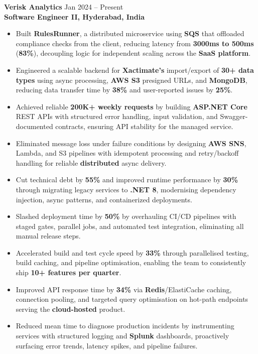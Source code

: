 \documentclass[a4paper,10pt]{article}
\begin{document}
\textbf{Verisk Analytics} \hfill Jan 2024 -- Present \\
\textbf{Software Engineer II, Hyderabad, India}
\begin{itemize}[leftmargin=*]
    \item Built \textbf{RulesRunner}, a distributed microservice using \textbf{SQS} that offloaded compliance checks from the client, reducing latency from \textbf{3000ms to 500ms} (\textbf{83\%}), decoupling logic for independent scaling across the \textbf{SaaS platform}.
    \item Engineered a scalable backend for \textbf{Xactimate's} import/export of \textbf{30+ data types} using async processing, \textbf{AWS S3} presigned URLs, and \textbf{MongoDB}, reducing data transfer time by \textbf{38\%} and user-reported issues by \textbf{25\%}.
    \item Achieved reliable \textbf{200K+ weekly requests} by building \textbf{ASP.NET Core} REST APIs with structured error handling, input validation, and Swagger-documented contracts, ensuring API stability for the managed service.
    \item Eliminated message loss under failure conditions by designing \textbf{AWS SNS}, Lambda, and S3 pipelines with idempotent processing and retry/backoff handling for reliable \textbf{distributed} async delivery.
    \item Cut technical debt by \textbf{55\%} and improved runtime performance by \textbf{30\%} through migrating legacy services to \textbf{.NET 8}, modernising dependency injection, async patterns, and containerized deployments.
    \item Slashed deployment time by \textbf{50\%} by overhauling CI/CD pipelines with staged gates, parallel jobs, and automated test integration, eliminating all manual release steps.
    \item Accelerated build and test cycle speed by \textbf{33\%} through parallelised testing, build caching, and pipeline optimisation, enabling the team to consistently ship \textbf{10+ features per quarter}.
    \item Improved API response time by \textbf{34\%} via \textbf{Redis}/ElastiCache caching, connection pooling, and targeted query optimisation on hot-path endpoints serving the \textbf{cloud-hosted} product.
    \item Reduced mean time to diagnose production incidents by instrumenting services with structured logging and \textbf{Splunk} dashboards, proactively surfacing error trends, latency spikes, and pipeline failures.
\end{itemize}
\end{document}

